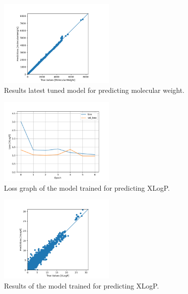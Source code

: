     \begin{figure}
        \centering
        \includegraphics[width=0.5\textwidth]{model_20_7_epochs_predictions_MolecularWeight.png}
        \caption{Results latest tuned model for predicting molecular weight.}
        \label{fig:model20-mol-weight-predictions}
    \end{figure}
    \begin{figure}
        \centering
        \includegraphics[width=0.5\textwidth]{model_7_7_epochs_loss_XLogP.png}
        \caption{Loss graph of the model trained for predicting XLogP.}
        \label{fig:model7-xlogp-loss}
    \end{figure}
    \begin{figure}
        \centering
        \includegraphics[width=0.5\textwidth]{model_7_7_epochs_predictions_XLogP.png}
        \caption{Results of the model trained for predicting XLogP.}
        \label{fig:model7-xlogp-predictions}
    \end{figure}
